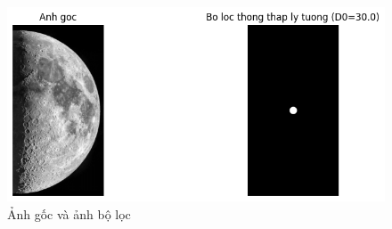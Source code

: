 \documentclass[12pt,a4paper]{report}
\numberwithin{equation}{section}
\theoremstyle{definition} %
\begin{document}
\begin{figure}[H]
\centering
\includegraphics[width=0.9\linewidth]{img/Ideallowpass.png}
\caption{Ảnh gốc và ảnh bộ lọc}
\label{fig112}
\end{figure}
\end{document}
